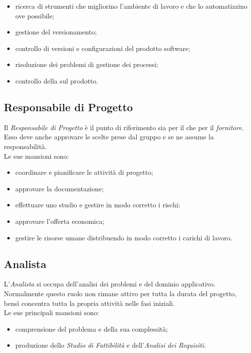 \documentclass[./../NomeDocumento.tex]{subfiles}
\begin{document}
	\begin{itemize}
		\item ricerca di strumenti che migliorino l’ambiente di lavoro e che lo automatizzino ove possibile;
		\item gestione del versionamento;
		\item controllo di versioni e configurazioni del prodotto software; 
		\item risoluzione dei problemi di gestione dei processi; 
		\item controllo della  sul prodotto.
	\end{itemize}
	
	\subsection {Responsabile di Progetto}
	
	Il \textit{Responsabile di Progetto} è il punto di riferimento sia per il  che per il \textit{fornitore}. Esso deve anche approvare le scelte prese dal gruppo e se ne assume la responsabilità. 
	\\ \noindent Le sue mansioni sono:
	
	\begin{itemize}
		\item coordinare e pianificare le attività di progetto;
		\item approvare la documentazione;
		\item effettuare uno studio e gestire in modo corretto i rischi;
		\item approvare l'offerta economica;
		\item gestire le risorse umane distribuendo in modo corretto i carichi di lavoro.
	\end{itemize}
	
	\subsection {Analista}
	
	L'\textit{Analista} si occupa dell'analisi dei problemi e del dominio applicativo. Normalmente questo ruolo non rimane attivo per tutta la durata del progetto, bensì concentra tutta la propria attività nelle fasi iniziali.
	\\ \noindent Le sue principali mansioni sono:
	
	\begin{itemize}
		\item comprensione del problema e della sua complessità;
		\item produzione dello \textit{Studio di Fattibilità} e dell'\textit{Analisi dei Requisiti}.
	\end{itemize}
	
\end{document}
